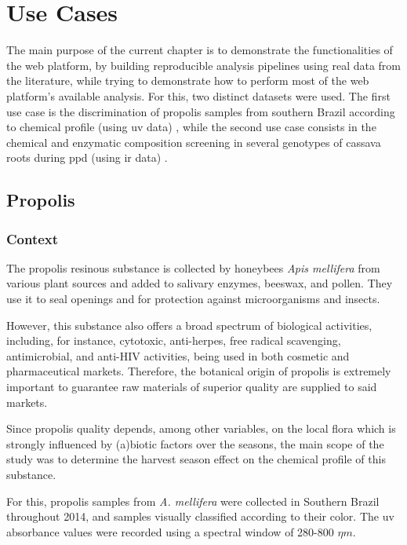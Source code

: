 
\chapter{Use Cases} \label{use_cases}

The main purpose of the current chapter is to demonstrate the functionalities of the web platform, by building reproducible analysis pipelines using real data from the literature, while trying to demonstrate how to perform most of the web platform's available analysis. For this, two distinct datasets were used. The first use case is the discrimination of propolis samples from southern Brazil according to chemical profile (using \gls{uv} data) \citep{tomazzoli2015discrimination}, while the second use case consists in the chemical and enzymatic composition screening in several genotypes of cassava roots during \gls{ppd} (using \gls{ir} data) \citep{uarrota2014metabolomics}.


\section{Propolis}

\subsection{Context}

The propolis resinous substance is collected by honeybees \textit{Apis mellifera} from various plant sources and added to salivary enzymes, beeswax, and pollen. They use it to seal openings and for protection against microorganisms and insects.

However, this substance also offers a broad spectrum of biological activities, including, for instance, cytotoxic, anti-herpes, free radical scavenging, antimicrobial, and anti-HIV activities, being used in both cosmetic and pharmaceutical markets. Therefore, the botanical origin of propolis is extremely important to guarantee raw materials of superior quality are supplied to said markets.

Since propolis quality depends, among other variables, on the local flora
which is strongly influenced by (a)biotic factors over the seasons, the main scope of the study was to determine the harvest season effect on the chemical profile of this substance.

For this, propolis samples from \textit{A. mellifera} were collected in Southern Brazil throughout 2014, and samples visually classified according to their color. The \gls{uv} absorbance values were recorded using a spectral window of 280-800 $\eta m$.


